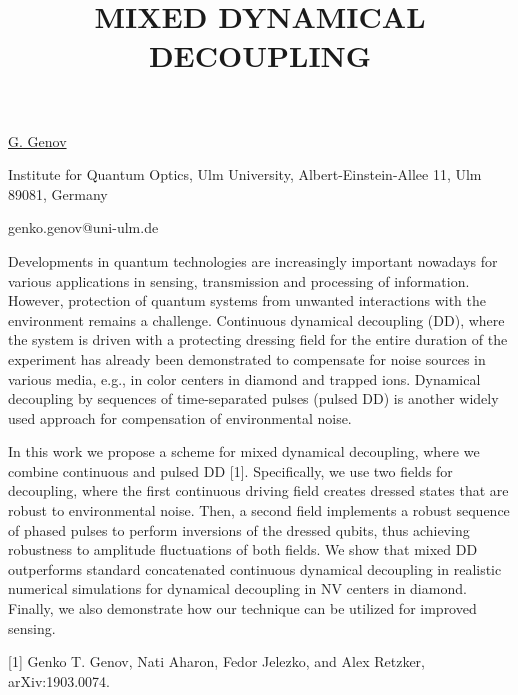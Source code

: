 \title{MIXED DYNAMICAL DECOUPLING}

\underline{G. Genov}  

{\normalsize{\vspace{-4mm}
Institute for Quantum Optics, Ulm University, Albert-Einstein-Allee 11, Ulm 89081, Germany



\email genko.genov@uni-ulm.de}}

Developments in quantum technologies are increasingly important nowadays for various applications in sensing, transmission and processing of information. However, protection of quantum systems from unwanted interactions with the environment remains a challenge. Continuous dynamical decoupling (DD), where the system is driven with a protecting dressing field for the entire duration of the experiment has already been demonstrated to compensate for noise sources in various media, e.g., in color centers in diamond and trapped ions. Dynamical decoupling by sequences of time-separated pulses (pulsed DD) is another widely used approach for compensation of environmental noise.

In this work we propose a scheme for mixed dynamical decoupling, where we combine continuous and pulsed DD [1]. Specifically, we use two fields for decoupling, where the first continuous driving field creates dressed states that are robust to environmental noise. Then, a second field implements a robust sequence of phased pulses to perform inversions of the dressed qubits, thus achieving robustness to amplitude fluctuations of both fields. We show that mixed DD outperforms standard concatenated continuous dynamical decoupling in realistic numerical simulations for dynamical decoupling in NV centers in diamond. Finally, we also demonstrate how our technique can be utilized for improved sensing.

{\normalsize
[1] Genko T. Genov, Nati Aharon, Fedor Jelezko, and Alex Retzker, arXiv:1903.0074.
}

\vspace{\baselineskip}